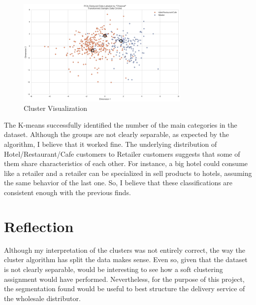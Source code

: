 \documentclass[a4paper]{article}
\begin{document}
\begin{figure}[ht!]
\centering
\includegraphics[width=0.75\textwidth]{figures/clustering_2.png}
\caption{\label{fig:clustering_2}Cluster Visualization}
\end{figure}

The K-means successfully identified the number of the main categories in the dataset. Although the groups are not clearly separable, as expected by the algorithm, I believe that it worked fine. The underlying distribution of Hotel/Restaurant/Cafe customers to Retailer customers suggests that some of them share characteristics of each other. For instance, a big hotel could consume like a retailer and a retailer can be specialized in sell products to hotels, assuming the same behavior of the last one. So, I believe that these classifications are consistent enough with the previous finds.


\section{Reflection}
\label{sec:reflection}
Although my interpretation of the clusters was not entirely correct, the way the cluster algorithm has split the data makes sense. Even so, given that the dataset is not clearly separable, would be interesting to see how a soft clustering assignment would have performed. Nevertheless, for the purpose of this project, the segmentation found would be useful to best structure the delivery service of the wholesale distributor.






\end{document}
